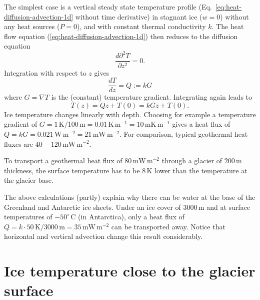 \documentclass[11pt,a4paper,halfparskip]{scrartcl}
\newcommand{\unit}[1]{\ensuremath{\,\mathrm{#1}}}
\newcommand{\cels}[1]{\ensuremath{#1^{\circ}\,\mathrm{C}}}
\begin{document}
The simplest case is a vertical steady state temperature profile
(Eq.~\ref{eq:heat-diffusion-advection-1d} without time derivative) in stagnant
ice ($w=0$) without any heat sources ($P=0$), and with constant thermal
conductivity $k$.  The heat flow equation
(\ref{eq:heat-diffusion-advection-1d}) then reduces to the diffusion equation
%
\begin{equation}
 \label{eq:diffusion-1d}
 \frac{d\partial^2T}{\partial z^2} = 0.
\end{equation}
%
Integration with respect to $z$ gives
%
\begin{equation}
 \label{eq:diffusion-1d-1int}
 \frac{dT}{d z} = Q := k G
\end{equation}
%
where $G = \nabla T$ is the (constant) temperature gradient. Integrating again
leads to
%
\begin{equation}
 \label{eq:diffusion-1d-2int}
 T(z) = Q z + T(0) = kGz + T(0).
\end{equation}
%
Ice temperature changes linearly with depth.  Choosing for example a
temperature gradient of $G=1\unit{K}/ 100\unit{m} = 0.01\unit{K}\unit{m}^{-1}
= 10 \unit{mK}\unit{m}^{-1}$ gives a heat flux of $Q = kG = 0.021\unit{W}
\unit{m}^{-2} = 21\unit{mW} \unit{m}^{-2}$.  For comparison, typical
geothermal heat fluxes are $40- 120 \unit{mW} \unit{m}^{-2}$.

To transport a geothermal heat flux of $80 \unit{mW} \unit{m}^{-2}$ through a
glacier of $200\unit{m}$ thickness, the surface temperature has to be
$8\unit{K}$ lower than the temperature at the glacier base.

The above calculations (partly) explain why there can be water at the base of
the Greenland and Antarctic ice sheets.  Under an ice cover of $3000\unit{m}$
and at surface temperatures of \cels{-50} (in Antarctica), only a heat flux of
$Q=k \cdot 50\unit{K}/3000\unit{m}= 35\unit{mW}\unit{m}^{-2}$ can be
transported away.  Notice that horizontal and vertical advection change this
result considerably.


\section{Ice temperature close to the glacier surface}
\label{sec:ice-temp-surface}
\end{document}
